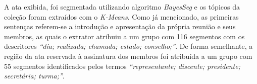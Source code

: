 



A ata exibida, foi segmentada utilizando algoritmo \textit{BayesSeg} e os tópicos da coleção foram extraídos com o \textit{K-Means}. Como já mencionado, as primeiras sentenças referem-se a introdução e apresentação da própria reunião e seus membros, as quais o extrator atribuiu a um grupo com 116 segmentos com os descritores \textit{``dia; realizada; chamada; estado; conselho;''}. De forma semelhante, a região da ata reservada à assinatura dos membros foi atribuída a um grupo com 55 segmentos identificados pelos termos \textit{``representante; discente; presidente; secretária; turma;''}. 



